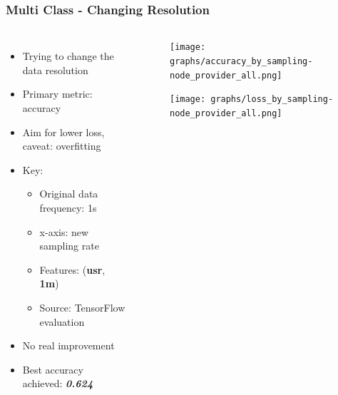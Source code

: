 \documentclass[aspectratio=169,11pt,hyperref={colorlinks=true}]{beamer}
\begin{document}
\begin{frame}
    \frametitle{Multi Class - Changing Resolution}
    \begin{columns}
        \begin{itemize}
            \item{Trying to change the data resolution}
            \item{Primary metric: accuracy}
            \item{Aim for lower loss, caveat: overfitting}
            \item{Key:}
            \begin{itemize}
              \item{Original data frequency: 1s}
              \item{x-axis: new sampling rate}
              \item{Features: (\textbf{usr}, \textbf{1m})}
              \item{Source: TensorFlow evaluation}
            \end{itemize}
            \item{No real improvement}
            \item{Best accuracy achieved: \emph{\textbf{0.624}}}
        \end{itemize}
        \begin{center}
        \begin{figure}
          \texttt{[image: graphs/accuracy\_by\_sampling-node\_provider\_all.png]}
        \end{figure}
        \begin{figure}
          \texttt{[image: graphs/loss\_by\_sampling-node\_provider\_all.png]}
        \end{figure}
      \end{center}
  \end{columns}
\end{frame}
\end{document}
